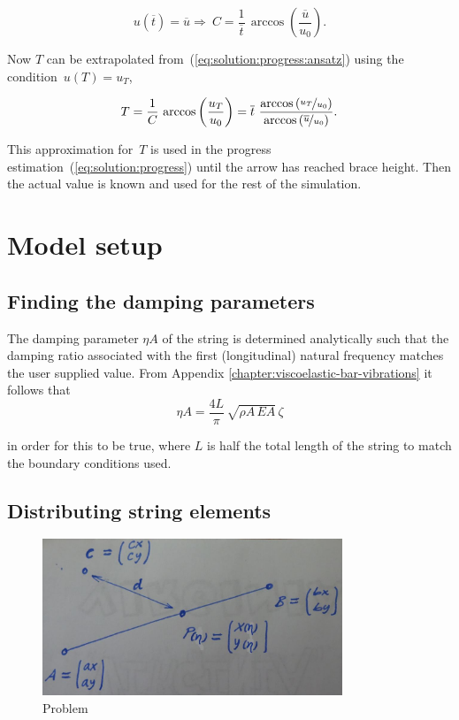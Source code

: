 \begin{equation}
u(\overline{t}) = \overline{u} \Rightarrow \ C = \frac{1}{\overline{t}}\,\arccos{\left(\frac{\overline{u}}{u_0}\right)}.\label{eq:solution:progress:constant}
\end{equation}

Now $T$ can be extrapolated from~(\ref{eq:solution:progress:ansatz}) using the condition~$u(T) = u_T$,

\begin{align}
T = \frac{1}{C}\,\arccos{\left(\frac{u_T}{u_0}\right)} = \overline{t}\ \frac{\arccos{\left(\nicefrac{u_T}{u_0}\right)}}{\arccos{\left(\nicefrac{\overline{u}}{u_0}\right)}}.
\end{align}

This approximation for~$T$ is used in the progress estimation~(\ref{eq:solution:progress}) until the arrow has reached brace height. Then the actual value is known and used for the rest of the simulation.




\newpage
\section{Model setup}

\subsection{Finding the damping parameters}

The damping parameter $\eta A$ of the string is determined analytically such that the damping ratio associated with the first (longitudinal) natural frequency matches the user supplied value. From Appendix \ref{chapter:viscoelastic-bar-vibrations} it follows that
%
\begin{equation}
\eta A = \frac{4L}{\pi}\,\sqrt{\rho A\,EA}\,\zeta
\end{equation}

in order for this to be true, where $L$ is half the total length of the string to match the boundary conditions used.

\subsection{Distributing string elements}

\begin{figure}[h]
\centering
\includegraphics[width=0.8\textwidth]{figures/setup/line-distance}
\caption{Problem}
\label{fig:solution:dynamic_progress}
\end{figure}

